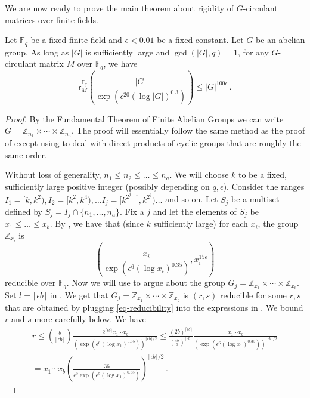\documentclass{toc}
\newcommand\F{{\mathbb{F}}}
\renewcommand\Z{{\mathbb{Z}}}
\begin{document}
We are now ready to prove the main theorem about rigidity of
%
$G$-circulant    %
matrices over finite fields.
\begin{theorem}\label{finitefield_allabelian}
Let $\F_q$ be a fixed finite field and $\epsilon < 0.01$ be a fixed constant.  Let $G$ be an abelian group.  As long as $|G|$ is sufficiently large and $\gcd(|G|,q) = 1$, for any 
%
$G$-circulant    %
matrix $M$
%
over $\F_q$, we have
\[
\textsf{r}_M^{\F_q}\left( \frac{|G|}{\exp\left(\epsilon^{20}(\log |G|)^{0.3}\right)}\right) \leq |G|^{100 \epsilon} \,.
\]
\end{theorem}
\begin{proof}
By the Fundamental Theorem of Finite Abelian Groups we can write $G = \Z_{n_1} \times \cdots \times \Z_{n_a}$.  The proof will essentially follow the same method as the proof of 
%
%
%
%
except using  to deal with direct products
of cyclic groups that are roughly the same
%
order.   %


  Without loss of generality, $n_1 \leq n_2 \leq \dots \leq n_a$.  We will choose $k$ to be a fixed, sufficiently large positive integer (possibly depending on $q,\epsilon$).  Consider the ranges $I_1 = [k,k^2), I_2 = [k^2, k^4), \dots I_j = [k^{2^{j-1}},k^{2^j}) \dots $ and so on.  Let $S_j$ be a multiset defined by $S_j = I_j \cap \{n_1, \dots, n_a \}$.  Fix a $j$ and let the elements of $S_j$ be $x_1 \leq \dots \leq x_b$.  By , we have that (since $k$ sufficiently large) for each $x_i$, the group $\Z_{x_i}$ is 
\begin{equation}\label{eq-reducibility}
\left( \frac{x_i}{\exp\left(\epsilon^6(\log x_i)^{0.35}\right)},  x_i^{15 \epsilon}\right) 
\end{equation}
reducible over $\F_q$.  Now we will use  to argue about the group $G_j = \Z_{x_1} \times \cdots \times \Z_{x_b}$.  Set $l = \lceil \epsilon b \rceil$ in .  We get that $G_j = \Z_{x_1} \times \cdots \times \Z_{x_b}$ is $(r,s)$ reducible for some $r,s$ that are obtained by plugging \eqref{eq-reducibility} into the expressions in .  We bound $r$ and $s$ more carefully below.  We have
\begin{align*}
r \leq \binom{b}{\lceil \epsilon b \rceil}\frac{2^{\lceil \epsilon b \rceil}x_1 \cdots x_b}{\left(\exp\left(\epsilon^6 (\log x_1)^{0.35}\right)\right)^{\lceil \epsilon b \rceil/2}} \leq \frac{(2b)^{\lceil \epsilon b \rceil}}{( \frac{\epsilon b}{3})^{\lceil \epsilon b \rceil}}\frac{x_1 \cdots x_b}{\left(\exp\left(\epsilon^6 (\log x_1)^{0.35}\right)\right)^{\lceil \epsilon b \rceil/2}} \\ = x_1 \cdots x_b\left( \frac{36}{\epsilon^2 \exp\left(\epsilon^6 (\log x_1)^{0.35}\right)} \right)^{\lceil \epsilon b \rceil/2} \,.
\end{align*}




\end{proof}
\end{document}
